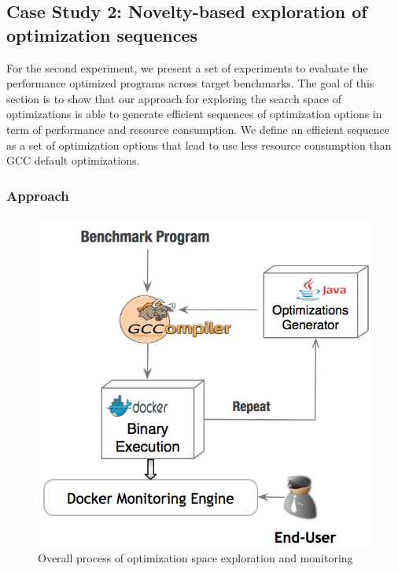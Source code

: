 \subsection{Case Study 2: Novelty-based exploration of optimization sequences}
For the second experiment, we present a set of experiments to evaluate the performance optimized programs across target benchmarks. The goal of this section
is to show that our approach for exploring the search space of optimizations is able to generate efficient sequences of optimization options in term of performance and
resource consumption. We define an efficient sequence as a
set of optimization options that lead to use less resource consumption than GCC default optimizations.
\subsubsection{Approach}
\begin{figure}[h]
	\centering
	\includegraphics[scale=0.50]{Ressources/infra_novelty.png}
	\caption{Overall process of optimization space exploration and monitoring}
\end{figure}
